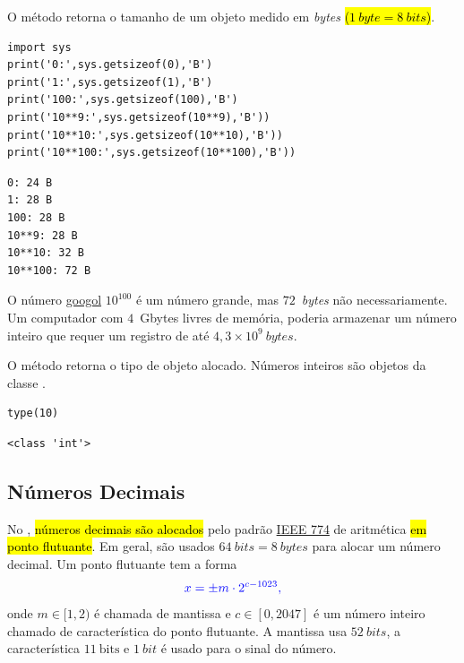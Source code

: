 \begin{ex}
  O método {\python} {\PYTHONsysDOTgetsizeof} retorna o tamanho de um objeto medido em \textit{bytes} \hl{($1~\textit{byte} = 8~\textit{bits}$)}.

\begin{lstlisting}
import sys
print('0:',sys.getsizeof(0),'B')
print('1:',sys.getsizeof(1),'B')
print('100:',sys.getsizeof(100),'B')
print('10**9:',sys.getsizeof(10**9),'B'))
print('10**10:',sys.getsizeof(10**10),'B'))
print('10**100:',sys.getsizeof(10**100),'B'))
\end{lstlisting}

\begin{verbatim}
0: 24 B
1: 28 B
100: 28 B
10**9: 28 B
10**10: 32 B
10**100: 72 B
\end{verbatim}

  O número \href{https://en.wikipedia.org/wiki/Googol}{googol} $10^{100}$ é um número grande, mas $72$~\textit{bytes} não necessariamente. Um computador com $4$~Gbytes livres de memória, poderia armazenar um número inteiro que requer um registro de até $4,3\times 10^9~\textit{bytes}$.
\end{ex}

\begin{obs}
  O método {\python} {\PYTHONtype} retorna o tipo de objeto alocado. Números inteiros são objetos da classe {\PYTHONint}.

\begin{lstlisting}
type(10)
\end{lstlisting}

\begin{verbatim}
<class 'int'>
\end{verbatim}

\end{obs}

\subsection{Números Decimais}\label{cap_lingua_sec_numop:subsec:float}

No {\python}, \hl{números decimais são alocados} pelo padrão \href{https://en.wikipedia.org/wiki/IEEE\_754}{IEEE 774} de aritmética \hl{em ponto flutuante}. Em geral, são usados $64~\textit{bits} = 8~\textit{bytes}$ para alocar um número decimal. Um ponto flutuante tem a forma
\begin{equation}\color{blue}x = \pm m\cdot 2^{c-1023},
\end{equation}
onde $m\in [1,2)$ é chamada de mantissa e $c\in [0, 2047]$ é um número inteiro chamado de característica do ponto flutuante. A mantissa usa $52~\textit{bits}$, a característica $11~\text{bits}$ e $1~\textit{bit}$ é usado para o sinal do número.

